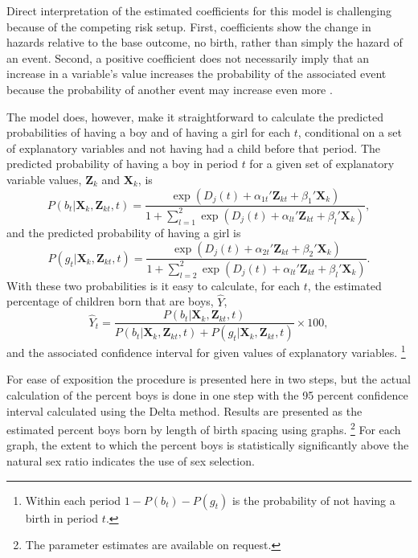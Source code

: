 \documentclass[12pt,letterpaper]{article}
\begin{document}
Direct interpretation of the estimated coefficients for this model is challenging because 
of the competing risk setup.
First, coefficients show the change in hazards relative to the base outcome, no birth, 
rather than simply the hazard of an event.
Second, a positive coefficient does not necessarily imply that an increase in a
variable's value increases the probability of the associated event because the 
probability of another event may increase even more \citep{thomas96}.

The model does, however, make it straightforward to calculate the 
predicted probabilities of having a boy and of having a girl for each $t$, conditional
on a set of explanatory variables and not having had a child before that period.
The predicted probability of having a boy in period $t$ for a given set of explanatory
variable values, $\mathbf{Z}_k$ and $\mathbf{X}_k$, is
\begin{equation}
P(b_{t} | \mathbf{X}_{k}, \mathbf{Z}_{kt}, t ) 
=  
\frac{ \exp(D_j(t) + \alpha_{1t}' \mathbf{Z}_{kt} + \beta_1' \mathbf{X}_{k} )}
{1 + \sum_{l=1}^2 \exp(D_j(t) + \alpha_{lt} ' \mathbf{Z}_{kt} + \beta_l ' \mathbf{X}_{k})},
\label{eq:probability_boy}
\end{equation}
and the predicted probability of having a girl is
\begin{equation}
P(g_{t} | \mathbf{X}_{k}, \mathbf{Z}_{kt},t ) 
=  
\frac{ \exp(D_j(t) + \alpha_{2t}'\mathbf{Z}_{kt} + \beta_2'\mathbf{X}_{k} )}
{1 + \sum_{l=2}^2 \exp(D_j(t) + \alpha_{lt}'\mathbf{Z}_{kt} + \beta_l'\mathbf{X}_{k})}.
\label{eq:probability_girl}
\end{equation}
With these two probabilities is it easy to calculate, for each $t$, the estimated
percentage of children born that are boys, $\hat{Y}$, 
\begin{equation}
\hat{Y}_t 
= 
\frac{ P(b_{t} | \mathbf{X}_{k}, \mathbf{Z}_{kt},t )}
{ P(b_{t} | \mathbf{X}_{k}, \mathbf{Z}_{kt},t) + P(g_{t} | \mathbf{X}_{k}, \mathbf{Z}_{kt},t )} 
\times 100,
\label{eq:probability_son}
\end{equation}
and the associated confidence interval for given values of explanatory variables.%
\footnote{
Within each period $1-P(b_{t})-P(g_{t})$ is the probability of not having a birth in 
period $t$.
}

For ease of exposition the procedure is presented here in two steps, but the actual
calculation of the percent boys is done in one step with the 95 percent confidence interval 
calculated using the Delta method.
Results are presented as the estimated percent boys born by length of birth spacing
using graphs.%
\footnote{
The parameter estimates are available on request.
}
For each graph, the extent to which the percent boys is statistically 
significantly above the natural sex ratio indicates the use of sex selection.
\end{document}
